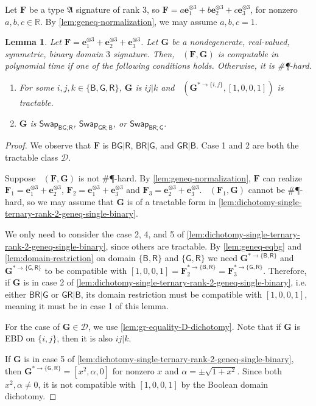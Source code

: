 \documentclass[11pt]{article}
\newtheorem{lemma}[theorem]{Lemma}
\DeclareMathOperator{\holbs}{Holant^*_2}
\DeclareMathOperator{\holts}{Holant^*_3}
\newcommand{\db}{\mathsf{B}}
\newcommand{\dg}{\mathsf{G}}
\newcommand{\dr}{\mathsf{R}}
\newcommand{\swhelper}[1]{$\mathsf{Swap}_{#1}$\xspace}
\newcommand{\swbg}{\swhelper{\db \dg; \dr}}
\newcommand{\swbr}{\swhelper{\db \dr; \dg}}
\newcommand{\swgr}{\swhelper{\dg \dr; \db}}
\newcommand{\sph}{\#\P-hard\xspace}
\newcommand{\teh}{^{\otimes 3}}
\newcommand{\domres}[1]{
  ^{*\to\{#1\}}
}
\newcommand{\strspt}{\textsf{EBD}\xspace}
\newcommand{\bdgr}{\dg \dr | \db}
\newcommand{\tractBGR}{$\mathscr{D}$\xspace}
\newcommand{\ternarytractgeneq}{$\mathfrak{A}$\xspace}
\begin{document}
Let $\mathbf{F}$ be a type \ternarytractgeneq signature of rank $3$, so $\mathbf{F} = a \mathbf{e}_1 \teh + b \mathbf{e}_2 \teh + c \mathbf{e}_3\teh$, for nonzero $a, b, c \in \mathbb{R}$.
By \cref{lem:geneq-normalization}, we may assume $a, b, c = 1$.
\begin{lemma}\label{lem:dichotomy-single-ternary-rank-3-geneq-single-binary}
  Let $\mathbf{F} = \mathbf{e}_1 \teh + \mathbf{e}_2 \teh + \mathbf{e}_3 \teh$.
  Let $\mathbf{G}$ be a nondegenerate, real-valued, symmetric, binary domain $3$ signature.
  Then, $\holts(\mathbf{F}, \mathbf{G})$ is computable in polynomial time if one of the following conditions holds. Otherwise, it is \sph.
  \begin{enumerate}
    \item For some $i, j, k \in \{\db, \dg, \dr\}$, $\mathbf{G}$ is $ij | k$ and $\holbs(\mathbf{G}\domres{i, j}, [1, 0, 0, 1])$ is tractable.
    \item $\mathbf{G}$ is \swbg, \swgr, or \swbr.
  \end{enumerate}
\end{lemma}
\begin{proof}
  We observe that $\mathbf{F}$ is $\db \dg | \dr$, $\db \dr | \dg$, and $\bdgr$.
  Case 1 and 2 are both the tractable class \tractBGR.

Suppose $\holts(\mathbf{F}, \mathbf{G})$ is not \sph.
  By \cref{lem:geneq-normalization}, $\mathbf{F}$ can realize $\mathbf{F}_1 = \mathbf{e}_1\teh + \mathbf{e}_2 \teh$, $\mathbf{F}_2 = \mathbf{e}_1 \teh + \mathbf{e}_3 \teh$ and $\mathbf{F}_3 = \mathbf{e}_2 \teh + \mathbf{e}_3 \teh$.
  $\holts(\mathbf{F}_1, \mathbf{G})$ cannot be \sph, so we may assume that $\mathbf{G}$ is of a tractable form in \cref{lem:dichotomy-single-ternary-rank-2-geneq-single-binary}.

  We only need to consider the case 2, 4, and 5 of \cref{lem:dichotomy-single-ternary-rank-2-geneq-single-binary}, since others are tractable.
  By \cref{lem:geneq-eqbg} and \cref{lem:domain-restriction} on domain $\{\db, \dr\}$ and $\{\dg, \dr\}$ we need $\mathbf{G}\domres{\db, \dr}$ and $\mathbf{G}\domres{\dg, \dr}$ to be compatible with $[1, 0, 0, 1] = \mathbf{F}_2\domres{\db, \dr} = \mathbf{F}_3\domres{\dg, \dr}$.
  Therefore, if $\mathbf{G}$ is in case 2 of \cref{lem:dichotomy-single-ternary-rank-2-geneq-single-binary}, i.e. either $\db \dr | \dg$ or $\bdgr$, its domain restriction must be compatible with $[1, 0, 0, 1]$, meaning it must be in case 1 of this lemma.

  For the case of $\mathbf{G} \in \mathcal{D}$, we use \cref{lem:gr-equality-D-dichotomy}.
  Note that if $\mathbf{G}$ is \strspt on $\{i, j\}$, then it is also $i j | k$.

  If $\mathbf{G}$ is in case 5 of \cref{lem:dichotomy-single-ternary-rank-2-geneq-single-binary}, then $\mathbf{G}\domres{\dg, \dr} = [x^2, \alpha, 0]$ for nonzero $x$ and $\alpha = \pm \sqrt{1 + x^2}$.
  Since both $x^2, \alpha \ne 0$, it is not compatible with $[1, 0, 0, 1]$ by the Boolean domain dichotomy. 
\end{proof}
\end{document}

